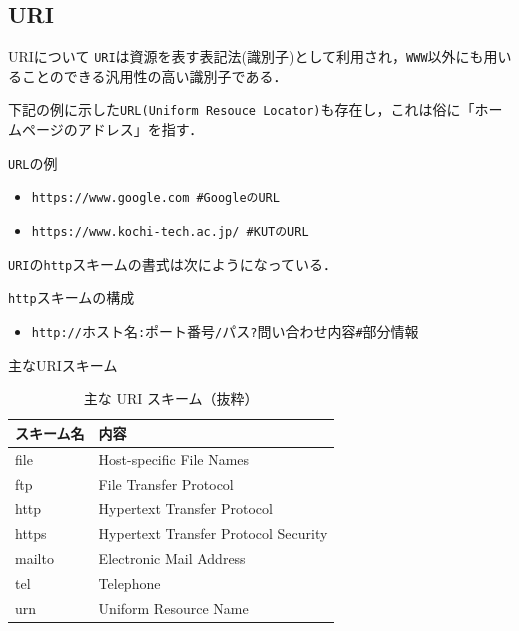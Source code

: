 \documentclass[11pt, aspectratio=169]{beamer}
\begin{document}
\subsection{URI}
\begin{frame}{URIについて}
  \texttt{URI}は資源を表す表記法(識別子)として利用され，\texttt{WWW}以外にも用いることのできる汎用性の高い識別子である．

  下記の例に示した\texttt{URL(Uniform Resouce Locator)}も存在し，これは俗に「ホームページのアドレス」を指す．

  \begin{exampleblock}{\texttt{URL}の例}
    \begin{itemize}
      \item \texttt{https://www.google.com              \#GoogleのURL}
      \item \texttt{https://www.kochi-tech.ac.jp/       \#KUTのURL}
    \end{itemize}
  \end{exampleblock}
  \texttt{URI}の\texttt{http}スキームの書式は次にようになっている．
  \begin{block}{\texttt{http}スキームの構成}
    \begin{itemize}
      \item \texttt{http://}ホスト名\texttt{:}ポート番号\texttt{/}パス\texttt{?}問い合わせ内容\texttt{\#}部分情報
    \end{itemize}
  \end{block}
\end{frame}

\begin{frame}{主なURIスキーム}
  \begin{table}
    \centering
    \caption{主な URI スキーム（抜粋）}
    \begin{tabular}{ll}
      \hline
      \textbf{スキーム名} & \textbf{内容} \\
      \hline
      file & Host-specific File Names \\
      ftp & File Transfer Protocol \\
      http & Hypertext Transfer Protocol \\
      https & Hypertext Transfer Protocol Security \\
      mailto & Electronic Mail Address \\
      tel & Telephone \\
      urn & Uniform Resource Name \\
      \hline
    \end{tabular}
  \end{table}
\end{frame}
\end{document}
